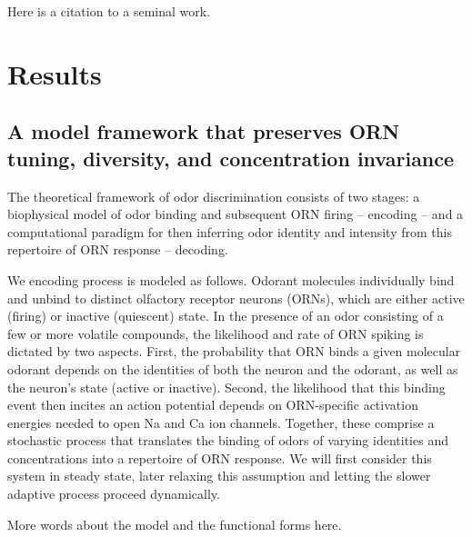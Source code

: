 
Here is a citation to a seminal work\cite{OKeeNade78a}. \lipsum[2-3]

\section*{Results}

\subsection*{A model framework that preserves ORN tuning, diversity, and concentration invariance}

The theoretical framework of odor discrimination consists of two stages: a biophysical model of odor binding and subsequent ORN firing -- encoding -- and a computational paradigm for then inferring odor identity and intensity from this repertoire of ORN response -- decoding. 

We encoding process is modeled as follows. Odorant molecules individually bind and unbind to distinct olfactory receptor neurons (ORNs), which are either active (firing) or inactive (quiescent) state. In the presence of an odor consisting of a few or more volatile compounds, the likelihood and rate of ORN spiking is dictated by two aspects. First, the probability that ORN binds a given molecular odorant depends on the identities of both the neuron and the odorant, as well as the neuron's state (active or inactive). Second, the likelihood that this binding event then incites an action potential depends on ORN-specific activation energies needed to open Na and Ca ion channels. Together, these comprise a stochastic process that translates the binding of odors of varying identities and concentrations into a repertoire of ORN response. We will first consider this system in steady state, later relaxing this assumption and letting the slower adaptive process proceed dynamically. 




{\color {blue} More words about the model and the functional forms here.}

